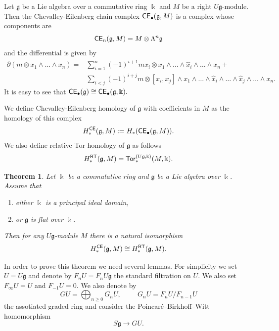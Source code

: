 \documentclass{amsart}
\numberwithin{equation}{section}
\newtheorem{theorem}{Theorem}[section]
\theoremstyle{definition}
\def\gg{\mathfrak{g}}
\def\kk{\Bbbk}
\begin{document}
Let $\gg$ be a Lie algebra over a commutative ring $\kk$ and $M$ be a right $U\gg$-module. Then the  Chevalley-Eilenberg chain complex ${\sf CE}_\bullet(\gg,M)$ is a complex whose components are
$${\sf CE}_n(\gg,M)=M\otimes \Lambda^n \gg$$
and the differential is given by 
\begin{equation*}
\begin{split}
\partial(m\otimes x_1\wedge \dots \wedge x_n)=& \sum_{i=1}^n(-1)^{i+1}mx_i\otimes x_1\wedge \dots \wedge \hat x_i \wedge \dots \wedge x_n + \\
&  \sum_{i<j}(-1)^{i+j} m \otimes  [x_i,x_j] \wedge x_1\wedge \dots \wedge \hat x_i \wedge \dots \wedge \hat x_j \wedge \dots \wedge x_n.
\end{split}
\end{equation*}
It is easy to see that ${\sf CE}_\bullet(\gg)\cong {\sf CE}_\bullet(\gg,\kk).$

We define Chevalley-Eilenberg homology of $\gg$ with coefficients in $M$ as the homology of this complex
$$H^{\sf CE}_*(\gg,M):=H_*({\sf CE}_\bullet(\gg,M)).$$
We also define relative Tor  homology of $\gg$ as follows
$$H_*^{\sf RT}(\gg,M)={\sf Tor}^{(U\gg,\kk)}_*(M,\kk).$$


\begin{theorem}\label{theorem_CE_rel} Let $\kk$ be a commutative ring and $\gg$ be a  Lie algebra over $\kk.$ Assume that 
\begin{enumerate}
    \item either $\kk$ is a principal ideal domain, 
    \item or $\gg$ is flat over $\kk.$ 
\end{enumerate}
Then for any $U\gg$-module $M$ there is a natural isomorphism 
$$H^{\sf CE}_*(\gg,M)\cong  H^{\sf RT}_*(\gg,M).$$
\end{theorem}

In order to prove this theorem we need several lemmas. For simplicity we set $U=U\gg$ and denote by $F_nU=F_nU\gg$ the standard filtration on $U.$ We also set $F_\infty U=U$ and $F_{-1}U=0.$ We also denote by 
$$GU = \bigoplus_{n\geq 0} G_nU, \hspace{1cm} 
G_nU=F_nU/F_{n-1}U$$
the assotiated graded ring and consider the Poincar\'e–Birkhoff–Witt homomorphism
$$S\gg \to GU.$$
\end{document}
